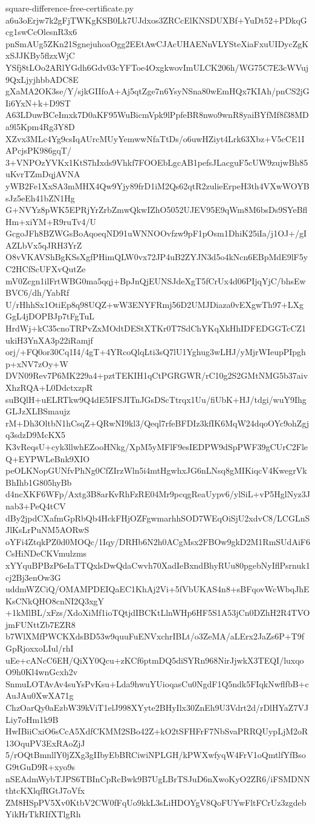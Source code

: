 \documentclass[11pt]{article}
\theoremstyle{definition}
\theoremstyle{remark}
\begin{document}
\begin{filecontents*}[overwrite]{square-difference-free-certificate.py}
a6u3oErjw7k2gFjTWKgKSB0Lk7UJdxos3ZRCcElKNSDUXBf+YuDt52+PDkqGcg1swCcOlesnR3x6
pnSmAUg5ZKn21SgnejuhoaOgg2EEtAwCJAcUHAENnVLYSteXiaFxuUIDycZgKxSJJKBy5flzxWjC
YSfj8tLOo2ARlYGdh6Gdv03cYFToe4OxgkwovImULCK206h/WG75C7E3cWVuj9QxLjyjhbbADC8E
gXaMA2OK3se/Y/sjkGIIfoA+Aj5qtZge7n6YsyNSna80wEmHQx7KIAh/pnCS2jGIi6YxN+k+D9ST
A63LDuwBCeImxk7D0aKF95WuBicmVpk9lPpfeBR8nwo9wnR8yaiBYfMf8f38MDa9l5Kpm4Rg3Y8D
XZvx3MLc4Yg9csIqAUrcMUyYemwwNfaTtDs/o6uwHZiyt4Lrk63Xbz+V5cCE1IAPcjsPK986gqT/
3+VNPOzYVKx1KtS7hIxds9Vhkf7FOOEbLgcAB1pefsJLacguF5cUW9zujwBh85uKvrTZmDqjAVNA
yWB2Fe1XxSA3mMHX4Qw9Yjy89frD1iM2Qs62qtR2zulieErpeH3th4VXwWOYBsJz5eEh41bZN1Hg
G+NVYz8pWK5EPRjYrZrbZmwQkwIZhO5052UJEV95E9qWm8M6bsDs9SYeBflHm+xiYM+R9ruTv4/U
GcgoJFh8BZWGsBoAqoeqND91uWNNOOvfzw9pF1pOsm1DhiK25iIa/j1OJ+/gIAZLbVx5qJRH3YrZ
O8vVKAVShBgKSsXgfPHimQLW0vx72JP4uB2ZYJN3d5o4kNcn6EBpMdE9lF5yC2HCfScUFXvQutZe
mV0Zcgn1ilFrtWBG0ma5qqj+BpJnQjEUNSJdeXgT5fCrUx4d06PIjqYjC/bhsEwBVC6/dh/YabRf
U/rHhhSx1OtiEp8q98UQZ+wW3ENYFRmj56D2UMJDiaza0vEXgwTh97+LXgGgL4jDOPBJp7tFgTuL
HrdWj+kC35cnoTRPvZxMOdtDEStXTKr0T7SdChYKqXkHhIDFEDGGTcCZ1ukiH3YnXA3p22iRamjf
orj/+FQ0or30Cq1I4/4gT+4YRcoQlqLti3sQ7lU1Yghug3wLHJ/yMjrWIeupPIpghp+xNV7zOy+W
DVN09Rev7P6MK229a4+pztTEKIH1qCtPGRGWR/rC10g2S2GMtNMG5b37aivXhzRQA+L0DdctxzpR
suBQlH+uELRTkw9Q4dE5IFSJITnJGsDScTtrqx1Uu/fiUbK+HJ/tdgi/wuY9IhgGLJzXLBSmaujz
rM+Dh3OltbN1hCsqZ+QRwNI9kl3/Qeql7rfeBFDIz3kfIK6MqW24dqoOYc9ohZgjq3sdzD9McKX5
K3vReqsU+cyk3llwhEZooHNkg/XpM5yMFlF9esIEDPW9dSpPWF39gCUrC2FleQ+EYPWLeBnk9XIO
peOLKNopGUNfvPhNg0CfZIrzWln5i4mtHgwhxJG6nLNsq8gMIKiqcV4KwegrVkBhIhb1G805hyBb
d4ncXKF6WFp/Axtg3B8arKvRhFzRE04Mr9pcqgReaUypv6/ylSiL+vP5HglNyz3Jnab3+PeQ4tCV
dBy2jpdCXafmGpRbQb4HckFHjOZFgwmarhhSOD7WEqOiSjU2xdvC8/LCGLnSJlKsLrPuNM5AORwS
oYFi4ZtqkPZ0d0MOQc/1Iqy/DRHb6N2h0ACgMsx2FBOw9gkD2M1RmSUdAiF6CsHiNDeCKVmulzms
xYYquBPBzP6eIaTTQxlsDwQdaCwvh70XadIeBxndBhyRUu80pgebNyIflPsrnuk1cj2Bj3enOw3G
uddmWZCiQ/OMAMPDEIQaEC1KhAj2Vi+5fVbUKAS4n8+sBFqovWcWbqJhEKsCNkQHO8cnNI2Q3xgY
+1kMlBL/xFzs/XdoXiMf1ioTQtjdIBCKtLlnWHp6HF5S1A53jCn0DZhH2R4TVOjmFUNttZb7EZR8
b7WlXMfPWCKXdsBD53w9quuFuENVxchrIBLt/o3ZeMA/aLErx2JaZs6P+T9fGpRjoxxoLIul/rhI
uEe+cANcC6EH/QiXY0Qcu+zKCf6ptmDQ5diSYRn968NirJjwkX3TEQI/luxqoO9h0Kl4wnGcxh2v
SnmuLOTAvAv4suYsPvKsu+Lda9hwuYUioqasCu0NgdF1Q5ndk5FIqkNwflfbB+cAuJAu0XwXA71g
ChzOarQy0aEzbW39kViT1elJ998XYyte2BHyIlx30ZnEh9U3Vdrt2d/rDlHYaZ7VJLiy7oHm1k9B
HwIBiiCxiO6sCcA5XdfCKMM2SBo42Z+kO2tSFHFrF7NbSvaPRRQUypLjM2oR13OquPV3ExRAoZjJ
5/rOQtBmnllY0jZXg3gIIbyEbBRCiwiNPLGH/kPWXwfyqW4FrV1oQmtlfYfBsoG9tGuD9R+xyo9s
nSEAdmWybTJPS6TBInCpRcBwk9B7UgLBrTSJuD6nXwoKyO2ZR6/iFSMDNNthtcKXlqfRGtJ7oVfx
ZM8HSpPV5Xv0KtbV2CW0fFqUo9kkL3sLiHDOYgV8QoFUYwFltFCrUz3zgdebYikHrTkRIfXTlgRh

\end{filecontents*}
\end{document}
